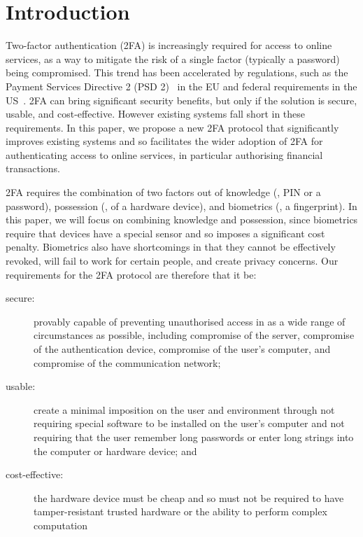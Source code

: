 


\section{Introduction}

Two-factor authentication (2FA) is increasingly required for access to online services, as a way to mitigate the risk of a single factor (typically a password) being compromised.
This trend has been accelerated by regulations, such as the Payment Services Directive 2 (PSD 2)~\cite{psd2} in the EU and federal requirements in the US~\cite{Zero-Trust-Cybersecurity}.
2FA can bring significant security benefits, but only if the solution is secure, usable, and cost-effective.
However existing systems fall short in these requirements.
In this paper, we propose a new 2FA protocol that significantly improves existing systems and so facilitates the wider adoption of 2FA for authenticating access to online services, in particular authorising financial transactions.

2FA requires the combination of two factors out of knowledge (\eg, PIN or a password), possession (\eg, of a hardware device), and biometrics (\eg, a fingerprint).
In this paper, we will focus on combining knowledge and possession, since biometrics require that devices have a special sensor and so imposes a significant cost penalty.
Biometrics also have shortcomings in that they cannot be effectively revoked, will fail to work for certain people, and create privacy concerns. Our requirements for the 2FA protocol are therefore that it be:%

\begin{description}
\item[secure:] provably capable of preventing unauthorised access in as a wide range of circumstances as possible, including compromise of the server, compromise of the authentication device, compromise of the user's computer, and compromise of the communication network;
\item[usable:] create a minimal imposition on the user and environment through not requiring special software to be installed on the user's computer and not requiring that the user remember long passwords or enter long strings into the computer or hardware device; and
\item[cost-effective:] the hardware device must be cheap and so must not be required to have tamper-resistant trusted hardware or the ability to perform complex computation
\end{description}

